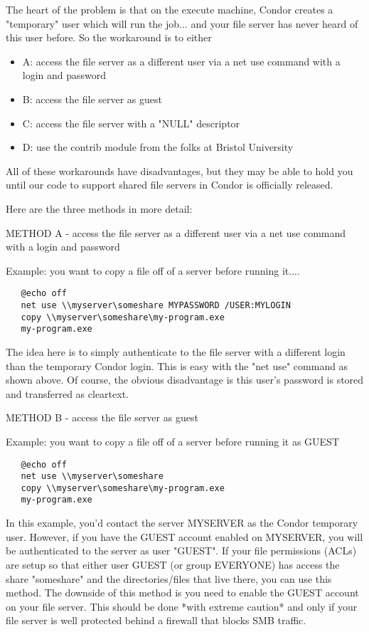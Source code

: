 \begin{description}
The heart of the problem is that on the execute machine, Condor creates a 
"temporary" user which will run the job... and your file server has never 
heard of this user before.  So the workaround is to either

\begin{itemize}
\item A: access the file server as a different user via a net use command with a 
login and password
\item B: access the file server as guest
\item C: access the file server with a "NULL" descriptor
\item D: use the contrib module from the folks at Bristol University
\end{itemize}

All of these workarounds have disadvantages, but they may be able to hold 
you until our code to support shared file servers in Condor is officially 
released.

Here are the three methods in more detail:

METHOD A - access the file server as a different user via a net use command 
with a login and password

Example: you want to copy a file off of a server before running it....

\begin{verbatim}
   @echo off
   net use \\myserver\someshare MYPASSWORD /USER:MYLOGIN
   copy \\myserver\someshare\my-program.exe
   my-program.exe
\end{verbatim}

The idea here is to simply authenticate to the file server with a different 
login than the temporary Condor login.  This is easy with the "net use" 
command as shown above.  Of course, the obvious disadvantage is this user's 
password is stored and transferred as cleartext.

METHOD B - access the file server as guest

Example: you want to copy a file off of a server before running it as GUEST

\begin{verbatim}
   @echo off
   net use \\myserver\someshare
   copy \\myserver\someshare\my-program.exe
   my-program.exe
\end{verbatim}

In this example, you'd contact the server MYSERVER as the Condor temporary 
user.  However, if you have the GUEST account enabled on MYSERVER, you will 
be authenticated to the server as user "GUEST".  If your file permissions 
(ACLs) are setup so that either user GUEST (or group EVERYONE) has access 
the share "someshare" and the directories/files that live there, you can 
use this method.  The downside of this method is you need to enable the 
GUEST account on your file server.   \Warn This should be done *with 
extreme caution* and only if your file server is well protected behind a 
firewall that blocks SMB traffic.


\end{description}
